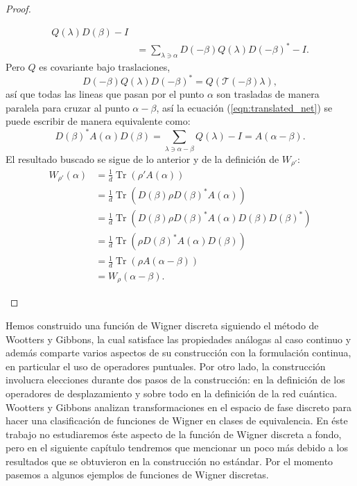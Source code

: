 \documentclass[a4paper,11pt]{report}
\DeclareMathOperator{\Tr}{Tr}
\begin{document}
\begin{proof}
\begin{enumerate}
\begin{align}
          Q(\lambda) D(\beta) - I \\
          &= \sum_{\lambda \ni \alpha}^{} 
          D(-\beta) Q(\lambda) D(-\beta)^{*} - I.
          \label{eqn:translated_net}
        \end{align}
        Pero $Q$ es covariante bajo traslaciones,
        \begin{equation}
          D(-\beta) Q(\lambda) D(-\beta)^{*}
          = Q\left(\mathcal T(-\beta) \lambda\right),
        \end{equation}
        así que todas las lineas que pasan por el punto
        $\alpha$ son trasladas de manera paralela para
        cruzar al punto $\alpha - \beta$, así la ecuación
        (\ref{eqn:translated_net}) se puede escribir de
        manera equivalente como:
        \begin{equation}
          D(\beta)^{*} A(\alpha) D(\beta) 
          = \sum_{\lambda \ni \alpha - \beta}^{} Q(\lambda)
          - I 
          = A(\alpha - \beta).
        \end{equation}
        El resultado buscado se sigue de lo anterior y de la
        definición de $W_{\rho'}$:
        \begin{align}
          W_{\rho'}(\alpha)
          &= \frac{1}{d} \Tr\left( \rho' A(\alpha) \right) \\
          &= \frac{1}{d} \Tr\left(D(\beta) \rho D(\beta)^{*}
          A(\alpha)\right) \\
          &= \frac{1}{d} \Tr\left( D(\beta) \rho
          D(\beta)^{*} A(\alpha) D(\beta) D(\beta)^{*}
          \right) \\
          &= \frac{1}{d} \Tr\left( \rho D(\beta)^{*}
          A(\alpha) D(\beta) \right) \\
          &= \frac{1}{d} \Tr\left( \rho A(\alpha-\beta)
          \right) \\
          &= W_\rho(\alpha-\beta).
        \end{align}
    \end{enumerate}
  \end{proof}

  Hemos construido una función de Wigner discreta siguiendo
  el método de Wootters y Gibbons, la cual satisface las
  propiedades análogas al caso continuo y además comparte
  varios aspectos de su construcción con la formulación
  continua, en particular el uso de operadores puntuales.
  Por otro lado, la construcción involucra elecciones
  durante dos pasos de la construcción: en la definición de
  los operadores de desplazamiento y sobre todo en la
  definición de la red cuántica. Wootters y Gibbons analizan
  transformaciones en el espacio de fase discreto para hacer
  una clasificación de funciones de Wigner en clases de
  equivalencia. En éste trabajo no estudiaremos éste aspecto
  de la función de Wigner discreta a fondo, pero en el
  siguiente capítulo tendremos que mencionar un poco más
  debido a los resultados que se obtuvieron en la
  construcción no estándar. Por el momento pasemos a algunos
  ejemplos de funciones de Wigner discretas.
\end{document}
